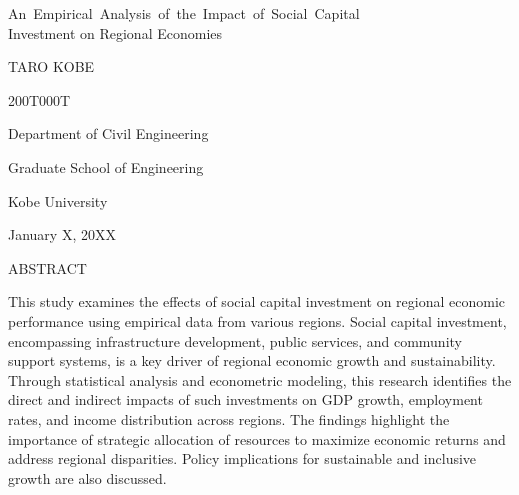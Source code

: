 \newpage

\begin{center}

{\LARGE 
\textsf{
\mbox{An Empirical Analysis of the Impact of Social Capital}\\
\vspace{0.3cm}
Investment on Regional Economies}}



\vspace{12mm}
TARO KOBE

\vspace{0.5mm}
200T000T

\vspace{0.5mm}
Department of Civil Engineering
 
Graduate School of Engineering

Kobe University
 
 \vspace{5mm}

January X, 20XX

\vspace{15mm}
\textsf{ABSTRACT}
\end{center}
 \vspace{6mm}
 
This study examines the effects of social capital investment on regional economic performance using empirical data from various regions. Social capital investment, encompassing infrastructure development, public services, and community support systems, is a key driver of regional economic growth and sustainability. Through statistical analysis and econometric modeling, this research identifies the direct and indirect impacts of such investments on GDP growth, employment rates, and income distribution across regions. The findings highlight the importance of strategic allocation of resources to maximize economic returns and address regional disparities. Policy implications for sustainable and inclusive growth are also discussed.

